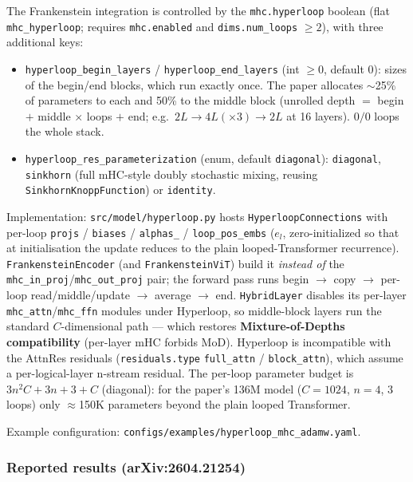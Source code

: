 The Frankenstein integration is controlled by the \texttt{mhc.hyperloop}
boolean (flat \texttt{mhc\_hyperloop}; requires \texttt{mhc.enabled} and
\texttt{dims.num\_loops} $\ge 2$), with three additional keys:
\begin{itemize}[leftmargin=*]
    \item \texttt{hyperloop\_begin\_layers} / \texttt{hyperloop\_end\_layers}
        (int $\ge 0$, default $0$): sizes of the begin/end blocks, which run
        exactly once. The paper allocates $\sim$25\% of parameters to each and
        50\% to the middle block (unrolled depth $=$ begin $+$ middle
        $\times$ loops $+$ end; e.g.\ $2L \to 4L(\times3) \to 2L$ at 16
        layers). $0/0$ loops the whole stack.
    \item \texttt{hyperloop\_res\_parameterization} (enum, default
        \texttt{diagonal}): \texttt{diagonal}, \texttt{sinkhorn} (full mHC-style
        doubly stochastic mixing, reusing
        \texttt{Sinkhorn\-Knopp\-Function}) or \texttt{identity}.
\end{itemize}

Implementation: \texttt{src/model/hyperloop.py} hosts
\texttt{HyperloopConnections} with per-loop \texttt{projs} / \texttt{biases} /
\texttt{alphas\_\*} / \texttt{loop\_pos\_embs} ($e_l$, zero-initialized so
that at initialisation the update reduces to the plain looped-Transformer
recurrence). \texttt{FrankensteinEncoder} (and \texttt{FrankensteinViT}) build
it \emph{instead of} the \texttt{mhc\_in\_proj}/\texttt{mhc\_out\_proj}
pair; the forward pass runs begin $\to$ copy $\to$ per-loop read/middle/update
$\to$ average $\to$ end. \texttt{HybridLayer} disables its per-layer
\texttt{mhc\_attn}/\texttt{mhc\_ffn} modules under Hyperloop, so middle-block
layers run the standard $C$-dimensional path --- which restores \textbf{Mixture-of-Depths
compatibility} (per-layer mHC forbids MoD). Hyperloop is incompatible with
the AttnRes residuals (\texttt{residuals.type} \texttt{full\_attn} /
\texttt{block\_attn}), which assume a per-logical-layer n-stream residual.
The per-loop parameter budget is $3n^2C + 3n + 3 + C$ (diagonal): for the
paper's 136M model ($C = 1024$, $n = 4$, 3 loops) only $\approx$150K
parameters beyond the plain looped Transformer.

Example configuration: \texttt{configs/examples/hyperloop\_mhc\_adamw.yaml}.

\subsubsection*{Reported results (arXiv:2604.21254)}


